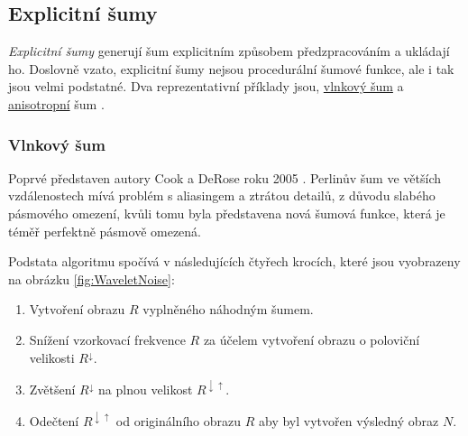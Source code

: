 \subsection{Explicitní šumy}
\label{ExplicitNoises}
\textit{Explicitní šumy} generují šum explicitním způsobem předzpracováním a ukládají ho. Doslovně vzato, explicitní šumy nejsou procedurální šumové funkce, ale i tak jsou velmi podstatné. Dva reprezentativní příklady jsou, \hyperref[WaveletNoise]{vlnkový šum} a \hyperref[AnisotropNoise]{anisotropní} šum \cite{Lagae10}.

\subsubsection{Vlnkový šum}
\label{WaveletNoise}
Poprvé představen autory Cook a DeRose roku 2005 \cite{Cook05}. Perlinův šum ve větších vzdálenostech mívá problém s aliasingem a ztrátou detailů, z důvodu slabého pásmového omezení, kvůli tomu byla představena nová šumová funkce, která je téměř perfektně pásmově omezená.

Podstata algoritmu spočívá v následujících čtyřech krocích, které jsou vyobrazeny na obrázku \ref{fig:WaveletNoise}:

\begin{enumerate}
	\item Vytvoření obrazu $R$ vyplněného náhodným šumem.
	\item Snížení vzorkovací frekvence $R$ za účelem vytvoření obrazu o poloviční velikosti $R^\downarrow$.
	\item Zvětšení $R^\downarrow$ na plnou velikost $R^{\downarrow\uparrow}$.
	\item Odečtení $R^{\downarrow\uparrow}$ od originálního obrazu $R$ aby byl vytvořen výsledný obraz $N$.
\end{enumerate}

